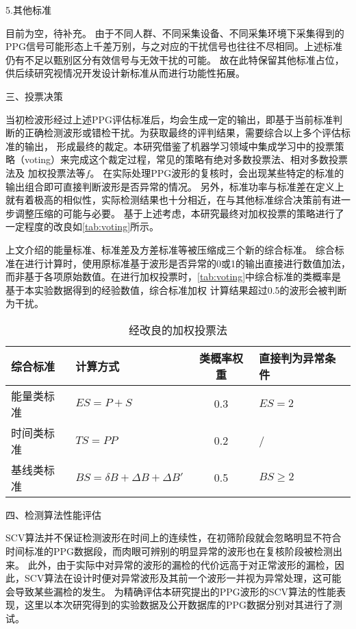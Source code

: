 5.其他标准

目前为空，待补充。
由于不同人群、不同采集设备、不同采集环境下采集得到的PPG信号可能形态上千差万别，与之对应的干扰信号也往往不尽相同。上述标准仍有不足以甄别区分有效信号与无效干扰的可能。
故在此特保留其他标准占位，供后续研究视情况开发设计新标准从而进行功能性拓展。

三、投票决策

当初检波形经过上述PPG评估标准后，均会生成一定的输出，即基于当前标准判断的正确检测波形或错检干扰。为获取最终的评判结果，需要综合以上多个评估标准的输出，
形成最终的裁定。本研究借鉴了机器学习领域中集成学习中的投票策略（voting）来完成这个裁定过程，常见的策略有绝对多数投票法、相对多数投票法及
加权投票法等$f$\cite{Zhou2016}。
在实际处理PPG波形的复核时，会出现某些特定的标准的输出组合即可直接判断波形是否异常的情况。
另外，标准功率与标准差在定义上就有着极高的相似性，实际检测结果也十分相近，在与其他标准综合决策前有进一步调整压缩的可能与必要。
基于上述考虑，本研究最终对加权投票的策略进行了一定程度的改良如\autoref{tab:voting}所示。

上文介绍的能量标准、标准差及方差标准等被压缩成三个新的综合标准。
综合标准在进行计算时，使用原标准基于波形是否异常的0或1的输出直接进行数值加法，而非基于各项原始数值。在进行加权投票时，\autoref{tab:voting}中综合标准的类概率是基于本实验数据得到的经验数值，综合标准加权
计算结果超过0.5的波形会被判断为干扰。
\begin{table}[htbp]
    \centering
    \caption{\label{tab:voting}经改良的加权投票法}
    \begin{tabularx}{\linewidth}{X<{\centering}X<{\centering}cX<{\centering}}
        \toprule
        \textbf{综合标准}&\textbf{计算方式}&\textbf{类概率权重}&\textbf{直接判为异常条件}\\
        \midrule
        能量类标准&     $ES=P+S$               &0.3& $ES =2$ \\
        时间类标准&     $TS=PP$&0.2&/\\
        基线类标准&     $BS=\delta B+\Delta B+\Delta B'$&0.5& $BS\ge 2$  \\
        \bottomrule
    \end{tabularx}
\end{table}

四、检测算法性能评估

SCV算法并不保证检测波形在时间上的连续性，在初筛阶段就会忽略明显不符合时间标准的PPG数据段，而肉眼可辨别的明显异常的波形也在复核阶段被检测出来。
此外，由于实际中对异常的波形的漏检的代价远高于对正常波形的漏检，因此，SCV算法在设计时便对异常波形及其前一个波形一并视为异常处理，这可能会导致某些漏检的发生。
为精确评估本研究提出的PPG波形的SCV算法的性能表现，这里以本次研究得到的实验数据及公开数据库的PPG数据分别对其进行了测试。

